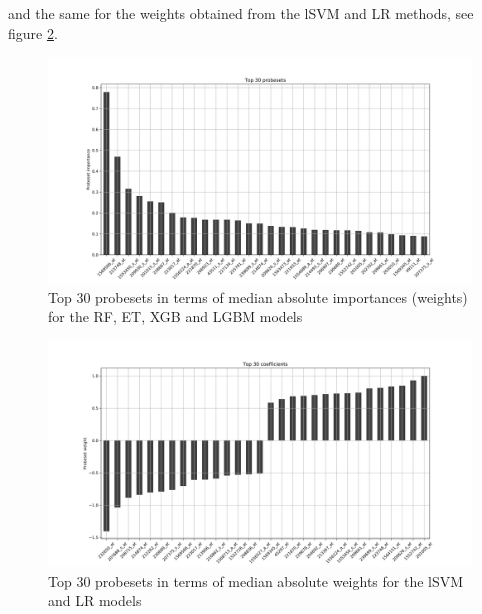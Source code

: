 \documentclass[a4paper,10pt]{article}
\begin{document}
and the same for the weights obtained from the lSVM and LR methods, see figure \ref{fig:coeffsFromModels}.
%
\begin{figure}[htp!]
\centering
\includegraphics[width=12cm]{images/top30_importances_FDR005}
\caption{Top $30$ probesets in terms of median absolute importances (weights) for the RF, ET, XGB and LGBM models}
\label{fig:weightsFromModels}
\end{figure}
%
\begin{figure}[htp!]
\centering
\includegraphics[width=12cm]{images/top30_weights_FDR005}
\caption{Top $30$ probesets in terms of median absolute weights for the lSVM and LR models}
\label{fig:coeffsFromModels}
\end{figure}
%
%
\end{document}
